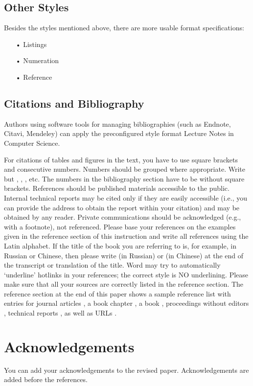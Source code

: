 \documentclass{llncs}
\begin{document}
\subsection{Other Styles}
Besides the styles mentioned above, there are more usable format specifications:
\begin{itemize}
    \item[•] Listings
    \item[•] Numeration
    \item[•] Reference 
\end{itemize}

\subsection{Citations and Bibliography}
Authors using software tools for managing bibliographies (such as Endnote, Citavi, Mendeley) can apply the preconfigured style format Lecture Notes in Computer Science.



For citations of tables and figures in the text, you have to use square brackets and consecutive numbers. 
Numbers should be grouped where appropriate. 
Write \cite{smith1981identification,may2006zib,foster1999grid,czajkowski2001grid,foster2002physiology} 
but \cite{smith1981identification}, \cite{foster1999grid}, \cite{foster2002physiology}, etc. 
The numbers in the bibliography section have to be without square brackets. 
References should be published materials accessible to the public. 
Internal technical reports may be cited only if they are easily accessible (i.e., you can provide the address to obtain the report within your citation) and may be obtained by any reader. 
Private communications should be acknowledged (e.g., with a footnote), not referenced. 
Please base your references on the examples given in the reference section of this instruction and write all references using the Latin alphabet. 
If the title of the book you are referring to is, for example, in Russian or Chinese, then please write (in Russian) or (in Chinese) at the end of the transcript or translation of the title. 
Word may try to automatically ‘underline’ hotlinks in your references; the correct style is NO underlining. 
Please make sure that all your sources are correctly listed in the reference section.
The reference section at the end of this paper shows a sample reference list with entries for journal articles \cite{smith1981identification}, 
a book chapter \cite{may2006zib}, 
a book \cite{foster1999grid}, 
proceedings without editors \cite{czajkowski2001grid}, 
technical reports \cite{foster2002physiology}, 
as well as URLs \cite{ncb}. 

\section{Acknowledgements}
You can add your acknowledgements to the revised paper. Acknowledgements are added before the references.





\end{document}
